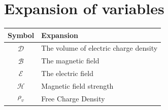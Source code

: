 \documentclass{article}
\begin{document}
\section{Expansion of variables}



\begin{center}
\begin{tabular}{ | m{5cm} | m{5cm} | } 
  \hline
  \textbf{Symbol} & \textbf{Expansion}  \\ 
  \hline
  $$\mathcal{D}$$ & The volume of electric charge density \\ 
  \hline
  $$\mathcal{B}$$ & The magnetic field \\  
  \hline
  $$\mathcal{E}$$ & The electric field \\  
  \hline
  $$\mathcal{H}$$ & Magnetic field strength \\  
  \hline
  $$\rho_{v}$$ & Free Charge Density\\
  \hline
\end{tabular}
\end{center}
\end{document}
